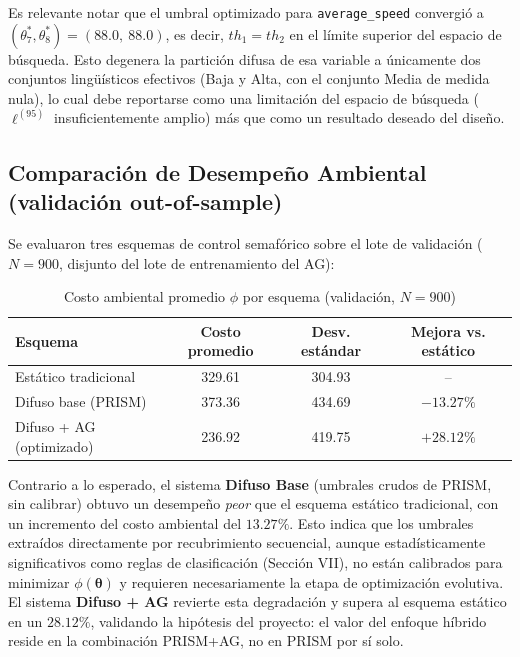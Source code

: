 \documentclass[12pt,a4paper]{article}
\begin{document}
Es relevante notar que el umbral optimizado para \texttt{average\_speed}
convergió a $(\theta_7^{*}, \theta_8^{*}) = (88.0,\ 88.0)$, es decir,
$th_1 = th_2$ en el límite superior del espacio de búsqueda. Esto
degenera la partición difusa de esa variable a únicamente dos conjuntos
lingüísticos efectivos (Baja y Alta, con el conjunto Media de medida
nula), lo cual debe reportarse como una limitación del espacio de
búsqueda ($\ell^{(95)}$ insuficientemente amplio) más que como un
resultado deseado del diseño.

\subsection{Comparación de Desempeño Ambiental (validación out-of-sample)}

Se evaluaron tres esquemas de control semafórico sobre el lote de
validación ($N=900$, disjunto del lote de entrenamiento del AG):

\begin{table}[H]
\centering
\caption{Costo ambiental promedio $\phi$ por esquema (validación, $N=900$)}
\begin{tabular}{lccc}
\toprule
\textbf{Esquema} & \textbf{Costo promedio} & \textbf{Desv. estándar} & \textbf{Mejora vs. estático} \\
\midrule
Estático tradicional & 329.61 & 304.93 & -- \\
Difuso base (PRISM) & 373.36 & 434.69 & $-13.27\%$ \\
Difuso + AG (optimizado) & 236.92 & 419.75 & $+28.12\%$ \\
\bottomrule
\end{tabular}
\end{table}

Contrario a lo esperado, el sistema \textbf{Difuso Base} (umbrales
crudos de PRISM, sin calibrar) obtuvo un desempeño \textit{peor} que el
esquema estático tradicional, con un incremento del costo ambiental del
$13.27\%$. Esto indica que los umbrales extraídos directamente por
recubrimiento secuencial, aunque estadísticamente significativos como
reglas de clasificación (Sección VII), no están calibrados para
minimizar $\phi(\boldsymbol{\theta})$ y requieren necesariamente la
etapa de optimización evolutiva. El sistema \textbf{Difuso + AG}
revierte esta degradación y supera al esquema estático en un
$28.12\%$, validando la hipótesis del proyecto: el valor del enfoque
híbrido reside en la combinación PRISM+AG, no en PRISM por sí solo.

\end{document}
